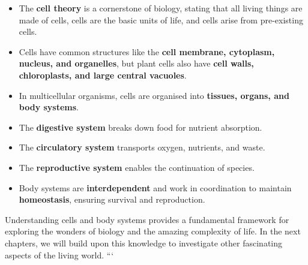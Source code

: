 \begin{itemize}
    \item The \textbf{cell theory} is a cornerstone of biology, stating that all living things are made of cells, cells are the basic units of life, and cells arise from pre-existing cells.
    \item Cells have common structures like the \textbf{cell membrane, cytoplasm, nucleus, and organelles}, but plant cells also have \textbf{cell walls, chloroplasts, and large central vacuoles}.
    \item In multicellular organisms, cells are organised into \textbf{tissues, organs, and body systems}.
    \item The \textbf{digestive system} breaks down food for nutrient absorption.
    \item The \textbf{circulatory system} transports oxygen, nutrients, and waste.
    \item The \textbf{reproductive system} enables the continuation of species.
    \item Body systems are \textbf{interdependent} and work in coordination to maintain \textbf{homeostasis}, ensuring survival and reproduction.
\end{itemize}

Understanding cells and body systems provides a fundamental framework for exploring the wonders of biology and the amazing complexity of life.  In the next chapters, we will build upon this knowledge to investigate other fascinating aspects of the living world.
```